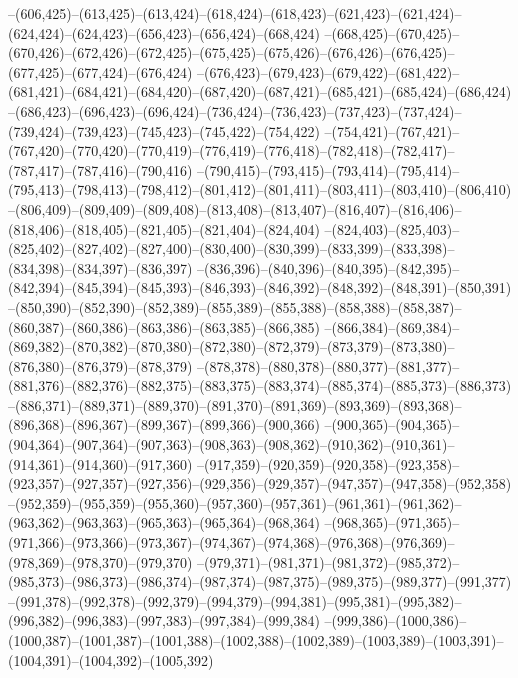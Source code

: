 --(606,425)--(613,425)--(613,424)--(618,424)--(618,423)--(621,423)--(621,424)--(624,424)--(624,423)--(656,423)--(656,424)--(668,424)
--(668,425)--(670,425)--(670,426)--(672,426)--(672,425)--(675,425)--(675,426)--(676,426)--(676,425)--(677,425)--(677,424)--(676,424)
--(676,423)--(679,423)--(679,422)--(681,422)--(681,421)--(684,421)--(684,420)--(687,420)--(687,421)--(685,421)--(685,424)--(686,424)
--(686,423)--(696,423)--(696,424)--(736,424)--(736,423)--(737,423)--(737,424)--(739,424)--(739,423)--(745,423)--(745,422)--(754,422)
--(754,421)--(767,421)--(767,420)--(770,420)--(770,419)--(776,419)--(776,418)--(782,418)--(782,417)--(787,417)--(787,416)--(790,416)
--(790,415)--(793,415)--(793,414)--(795,414)--(795,413)--(798,413)--(798,412)--(801,412)--(801,411)--(803,411)--(803,410)--(806,410)
--(806,409)--(809,409)--(809,408)--(813,408)--(813,407)--(816,407)--(816,406)--(818,406)--(818,405)--(821,405)--(821,404)--(824,404)
--(824,403)--(825,403)--(825,402)--(827,402)--(827,400)--(830,400)--(830,399)--(833,399)--(833,398)--(834,398)--(834,397)--(836,397)
--(836,396)--(840,396)--(840,395)--(842,395)--(842,394)--(845,394)--(845,393)--(846,393)--(846,392)--(848,392)--(848,391)--(850,391)
--(850,390)--(852,390)--(852,389)--(855,389)--(855,388)--(858,388)--(858,387)--(860,387)--(860,386)--(863,386)--(863,385)--(866,385)
--(866,384)--(869,384)--(869,382)--(870,382)--(870,380)--(872,380)--(872,379)--(873,379)--(873,380)--(876,380)--(876,379)--(878,379)
--(878,378)--(880,378)--(880,377)--(881,377)--(881,376)--(882,376)--(882,375)--(883,375)--(883,374)--(885,374)--(885,373)--(886,373)
--(886,371)--(889,371)--(889,370)--(891,370)--(891,369)--(893,369)--(893,368)--(896,368)--(896,367)--(899,367)--(899,366)--(900,366)
--(900,365)--(904,365)--(904,364)--(907,364)--(907,363)--(908,363)--(908,362)--(910,362)--(910,361)--(914,361)--(914,360)--(917,360)
--(917,359)--(920,359)--(920,358)--(923,358)--(923,357)--(927,357)--(927,356)--(929,356)--(929,357)--(947,357)--(947,358)--(952,358)
--(952,359)--(955,359)--(955,360)--(957,360)--(957,361)--(961,361)--(961,362)--(963,362)--(963,363)--(965,363)--(965,364)--(968,364)
--(968,365)--(971,365)--(971,366)--(973,366)--(973,367)--(974,367)--(974,368)--(976,368)--(976,369)--(978,369)--(978,370)--(979,370)
--(979,371)--(981,371)--(981,372)--(985,372)--(985,373)--(986,373)--(986,374)--(987,374)--(987,375)--(989,375)--(989,377)--(991,377)
--(991,378)--(992,378)--(992,379)--(994,379)--(994,381)--(995,381)--(995,382)--(996,382)--(996,383)--(997,383)--(997,384)--(999,384)
--(999,386)--(1000,386)--(1000,387)--(1001,387)--(1001,388)--(1002,388)--(1002,389)--(1003,389)--(1003,391)--(1004,391)--(1004,392)--(1005,392)
